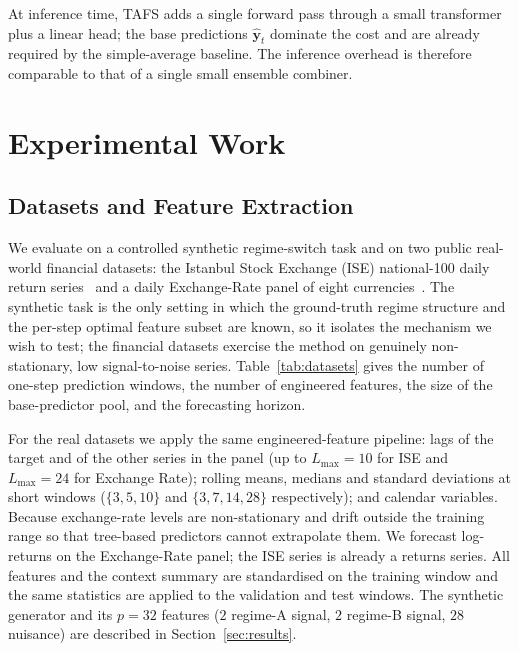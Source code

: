 \documentclass[journal]{IEEEtran}
\begin{document}
At inference time, TAFS adds a single forward pass through a small transformer plus a linear head; the base predictions $\boldsymbol{\hat{y}}_t$ dominate the cost and are already required by the simple-average baseline. The inference overhead is therefore comparable to that of a single small ensemble combiner.

\section{Experimental Work}
\label{sec:experiments}

\subsection{Datasets and Feature Extraction}
\label{sec:datasets}

We evaluate on a controlled synthetic regime-switch task and on two public real-world financial datasets: the Istanbul Stock Exchange (ISE) national-100 daily return series~\cite{akbilgic2014ise} and a daily Exchange-Rate panel of eight currencies~\cite{lai2018lstnet}. The synthetic task is the only setting in which the ground-truth regime structure and the per-step optimal feature subset are known, so it isolates the mechanism we wish to test; the financial datasets exercise the method on genuinely non-stationary, low signal-to-noise series. Table~\ref{tab:datasets} gives the number of one-step prediction windows, the number of engineered features, the size of the base-predictor pool, and the forecasting horizon.



For the real datasets we apply the same engineered-feature pipeline: lags of the target and of the other series in the panel (up to $L_{\max}{=}10$ for ISE and $L_{\max}{=}24$ for Exchange Rate); rolling means, medians and standard deviations at short windows ($\{3,5,10\}$ and $\{3,7,14,28\}$ respectively); and calendar variables. Because exchange-rate levels are non-stationary and drift outside the training range so that tree-based predictors cannot extrapolate them. We forecast log-returns on the Exchange-Rate panel; the ISE series is already a returns series. All features and the context summary are standardised on the training window and the same statistics are applied to the validation and test windows. The synthetic generator and its $p{=}32$ features ($2$ regime-A signal, $2$ regime-B signal, $28$ nuisance) are described in Section~\ref{sec:results}.
\end{document}
